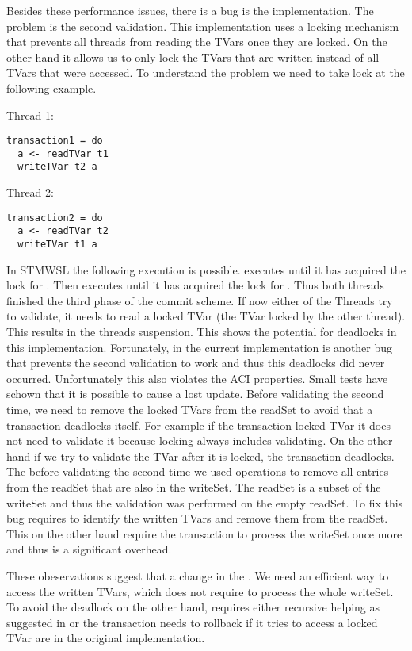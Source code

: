 Besides these performance issues, there is a bug is the implementation. The problem is the second validation. 
This implementation uses a locking mechanism that prevents all threads from reading the TVars once they are locked.
On the other hand it allows us to only lock the TVars that are written instead of all TVars that were accessed.
To understand the problem we need to take lock at the following example.
\par\noindent
\begin{minipage}[t]{.45\textwidth}
Thread 1:
\begin{lstlisting}[frame=lrtb]
transaction1 = do
  a <- readTVar t1
  writeTVar t2 a
\end{lstlisting}
\end{minipage}
\hfill
\begin{minipage}[t]{.45\textwidth}
Thread 2:
\begin{lstlisting}[frame=lrtb]
transaction2 = do
  a <- readTVar t2
  writeTVar t1 a
\end{lstlisting}
\end{minipage}
In STMWSL the following execution is possible.  executes until it has acquired the lock for 
. Then  executes until it has acquired the lock for . Thus both threads
finished the third phase of the commit scheme. If now either of the Threads try to validate, it needs to 
read a locked TVar (the TVar locked by the other thread). This results in the threads suspension. This 
shows the potential for deadlocks in this implementation. Fortunately, in the current implementation is
another bug that prevents the second validation to work and thus this deadlocks did never occurred.
Unfortunately this also violates the ACI properties. Small tests have schown that it is possible to 
cause a lost update. Before validating the second time, we need to remove the locked TVars from the 
readSet to avoid that a transaction deadlocks itself. For example if the transaction locked TVar 
it does not need to validate it because locking always includes validating. On the other hand if we try to
validate the TVar after it is locked, the transaction deadlocks. The before validating the second time 
we used  operations to remove all entries from the readSet that are also in the writeSet. 
The readSet is a subset of the writeSet and thus the validation was performed on the empty readSet.
To fix this bug requires to identify the written TVars and remove them from the readSet. This on the other
hand require the transaction to process the writeSet once more and thus is a significant overhead. 

These obeservations suggest that a change in the . We need an efficient way to access 
the written TVars, which does not require to process the whole writeSet. To avoid the deadlock on the other hand,
requires either recursive helping as suggested in \parencite{lockfreedom} or the transaction needs to 
rollback if it tries to access a locked TVar are in the original implementation.